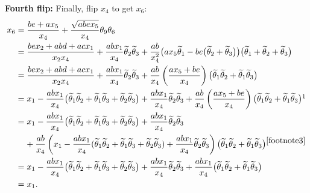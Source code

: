 \documentclass[pdftex]{sigma}
\numberwithin{equation}{section}
\begin{document}
{\textbf{Fourth flip:} Finally, flip $x_4$ to get $x_6$:
\begin{align*}
 x_6 &= \frac{be + ax_5}{x_4} + \frac{\sqrt{abex_5}}{x_4} \theta_9 \theta_6
 \\&= \frac{bex_2 + abd + acx_1}{x_2 x_4}+\frac{abx_1}{x_4} \widetilde{\theta}_2 \widetilde{\theta}_3
 + \frac{ab}{x_4^2} \big( a x_5 \widetilde{\theta}_1 - be \big(\widetilde{\theta}_2 + \widetilde{\theta}_3\big)\big)
 \big(\widetilde{\theta}_1 + \widetilde{\theta}_2 + \widetilde{\theta}_3\big) \\
 &={ \frac{bex_2 + abd + acx_1}{x_2 x_4} + \frac{abx_1}{x_4} \widetilde{\theta}_2 \widetilde{\theta}_3
 + \frac{ab}{x_4} \left( \frac{a x_5 + be}{x_4}\right) \big(\widetilde{\theta}_1 \widetilde{\theta}_2 + \widetilde{\theta}_1 \widetilde{\theta}_3\big) } \\
 &= { x_1 - \frac{abx_1}{x_4} \big(\widetilde{\theta}_1 \widetilde{\theta}_2 + \widetilde{\theta}_1 \widetilde{\theta}_3 + \widetilde{\theta}_2 \widetilde{\theta}_3 \big) + \frac{abx_1}{x_4} \widetilde{\theta}_2 \widetilde{\theta}_3
 + \frac{ab}{x_4} \left( \frac{a x_5 + be}{x_4}\right)
 \big(\widetilde{\theta}_1 \widetilde{\theta}_2 + \widetilde{\theta}_1 \widetilde{\theta}_3\big)} \footnotemark \\
 &= { x_1 - \frac{abx_1}{x_4} \big(\widetilde{\theta}_1 \widetilde{\theta}_2 + \widetilde{\theta}_1 \widetilde{\theta}_3 + \widetilde{\theta}_2 \widetilde{\theta}_3 \big) + \frac{abx_1}{x_4} \widetilde{\theta}_2 \widetilde{\theta}_3} \\
 &\phantom{=} \ {} + { \frac{ab}{x_4} \left(x_1 - \frac{abx_1}{x_4} (\widetilde{\theta}_1 \widetilde{\theta}_2 + \widetilde{\theta}_1 \widetilde{\theta}_3 + \widetilde{\theta}_2 \widetilde{\theta}_3) + \frac{abx_1}{x_4} \widetilde{\theta}_2 \widetilde{\theta}_3
\right)
 \big(\widetilde{\theta}_1 \widetilde{\theta}_2 + \widetilde{\theta}_1 \widetilde{\theta}_3\big)} {}^{\ref{footnote3}} \\
 &= {x_1 - \frac{abx_1}{x_4} \big(\widetilde{\theta}_1 \widetilde{\theta}_2 + \widetilde{\theta}_1 \widetilde{\theta}_3 + \widetilde{\theta}_2 \widetilde{\theta}_3 \big) + \frac{abx_1}{x_4} \widetilde{\theta}_2 \widetilde{\theta}_3
 + \frac{abx_1 }{x_4} \big(\widetilde{\theta}_1 \widetilde{\theta}_2 + \widetilde{\theta}_1 \widetilde{\theta}_3\big)} \\
 &= x_1.
\end{align*}
}
\end{document}
